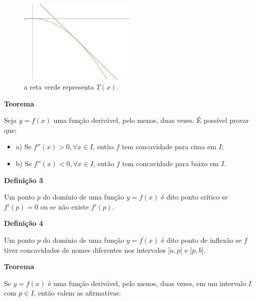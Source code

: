 \documentclass{article}
\begin{document}
{\begin{newpage}
\begin{figure}[htbp]
\begin{center}
\includegraphics[width=0.5\textwidth, angle=0]{Grafico7.png}
\end{center}
\caption{a reta verde representa $T(x)$.}
\end{figure}

\par
\vspace{0.3cm}
\textbf{Teorema}
\par Seja $y=f(x)$ uma função derivável, pelo menos, duas vezes. É possível provar que:
\begin{itemize}
\item a) Se $f''(x)>0, \forall x\in I$, então $f$ tem concavidade para cima em $I$;
\item b) Se $f''(x)<0, \forall x\in I$, então $f$ tem concavidade para baixo em $I$.
\end{itemize}
\par
\vspace{0.3cm}
\begin{flushleft}
\textbf{Definição 3}
\end{flushleft}
\par Um ponto $p$ do domínio de uma função $y=f(x)$ é dito ponto crítico se $f'(p)=0$ ou se não existe $f'(p)$.
\par
\vspace{0.3cm}
\begin{flushleft}
\textbf{Definição 4}
\end{flushleft}
\par Um ponto $p$ do domínio de uma função $y=f(x)$ é dito ponto de inflexão se $f$ tiver concavidades de nomes diferentes nos intervalos $]a,p[$ e $]p,b[$.
\par
\vspace{0.3cm}
\textbf{Teorema}
\par Se $y=f(x)$ é uma função derivável, pelo menos, duas vezes, em um intervalo $I$ com $p\in I$, então valem as afirmativas:
\begin{itemize}

\end{itemize}
\end{newpage}}
\end{document}
